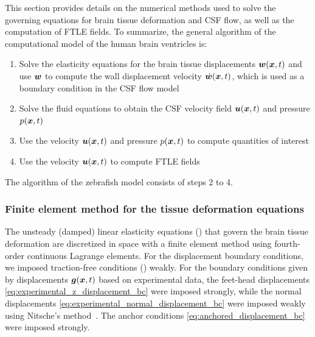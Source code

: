 \documentclass{template}
\begin{document}
This section provides details on the numerical methods used
to solve the governing equations for brain tissue deformation and CSF flow,
as well as the computation of FTLE fields.
To summarize, the general algorithm of the computational model of the human
brain ventricles is:
\begin{enumerate}
    \item Solve the elasticity equations for the brain tissue displacements $\bm{w}(\bm{x}, t)$
    and use $\bm{w}$ to compute the wall displacement velocity $\dot{\bm{w}}(\bm{x}, t)$,
    which is used as a boundary condition in the CSF flow model
    \item Solve the fluid equations to obtain the CSF velocity field $\bm{u}(\bm{x}, t)$ and pressure $p(\bm{x}, t)$
    \item Use the velocity $\bm{u}(\bm{x}, t)$ and pressure $p(\bm{x}, t)$ to compute quantities of interest
    \item Use the velocity $\bm{u}(\bm{x}, t)$ to compute FTLE fields
\end{enumerate}
The algorithm of the zebrafish model consists of steps 2 to 4.

\subsubsection{Finite element method for the tissue deformation equations}
The unsteady (damped) linear elasticity equations ()
that govern the brain tissue deformation are discretized in space with a finite element method 
using fourth-order continuous Lagrange elements. For the displacement boundary conditions,
we imposed traction-free conditions ()
weakly. For the boundary conditions given by displacements $\bm{g}(\bm{x}, t)$ based on experimental data,
the feet-head displacements \eqref{eq:experimental_z_displacement_bc} were imposed strongly,
while the normal displacements \eqref{eq:experimental_normal_displacement_bc}
were imposed weakly using Nitsche's method~\citep{Nitsche1971UberSind,
benzaken2024constructing}. The anchor conditions \eqref{eq:anchored_displacement_bc}
were imposed strongly.
\end{document}
